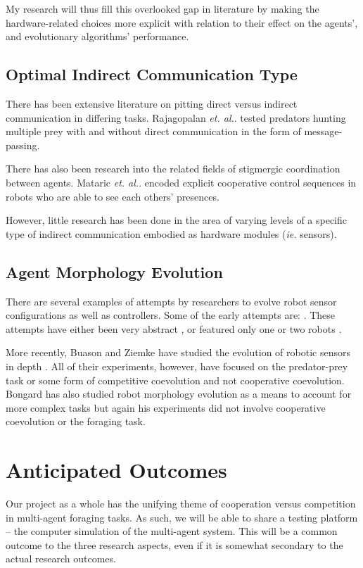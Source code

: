 \documentclass[a4paper,12pt]{article}
\begin{document}
My research will thus fill this overlooked gap in literature by making the hardware-related choices more explicit with relation to their effect on the agents’, and evolutionary algorithms’ performance.

\subsection{Optimal Indirect Communication Type}
There has been extensive literature on pitting direct versus indirect communication in differing tasks. Rajagopalan \textit{et. al.}. tested predators hunting multiple prey with and without direct communication in the form of message-passing. \cite{Rajagopalan11}

There has also been research into the related fields of stigmergic coordination between agents. Mataric \textit{et. al.}. encoded explicit cooperative control sequences in robots who are able to see each others’ presences. \cite{Werger99}

However, little research has been done in the area of varying levels of a specific type of indirect communication embodied as hardware modules (\textit{ie.} sensors).


\subsection{Agent Morphology Evolution}
There are several examples of attempts by researchers to evolve robot sensor configurations as well as controllers. Some of the early attempts are: \cite{Sims94,Balakrishnan96,Lee:1996}. These attempts have either been very abstract \cite{Balakrishnan96}, or featured only one or two robots \cite{Sims94}.

More recently, Buason and Ziemke have studied the evolution of robotic sensors in depth \cite{Buason:2003, Buason:2005}. All of their experiments, however, have focused on the predator-prey task or some form of competitive coevolution and not cooperative coevolution. Bongard has also studied robot morphology evolution as a means to account for more complex tasks \cite{Bongard:2009,Bongard:2010} but again his experiments did not involve cooperative coevolution or the foraging task.

\section{Anticipated Outcomes}
Our project as a whole has the unifying theme of cooperation versus competition in multi-agent foraging tasks. As such, we will be able to share a testing platform -- the computer simulation of the multi-agent system. This will be a common outcome to the three research aspects, even if it is somewhat secondary to the actual research outcomes.
\end{document}

